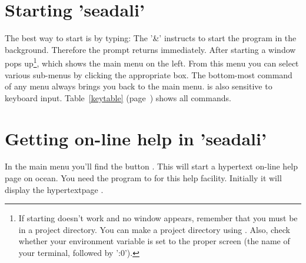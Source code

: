 \section{Starting 'seadali'}
\label{s-start-seadali}
The best way to start  is by typing:
The '\&' instructs  to start the program in the background.
Therefore the prompt returns immediately.
After starting a window pops up\footnote{If starting  doesn't
work and no window appears, remember that you must be in 
a project directory. You can make a project directory using .
Also, check whether your  environment variable is
set to the proper screen (the name of your terminal, followed by ':0').},
which shows the main menu on the left.
From this menu you can select various sub-menus by clicking the
appropriate box.
The bottom-most command of any menu always brings you back
to the main menu.  is also sensitive to keyboard input.
Table~\ref{keytable} (page~\pageref{keytable}) shows all commands.

\section{Getting on-line help in 'seadali'}
In the main menu you'll find the button . This will start a
hypertext on-line help page on ocean. You need the program  to
for this help facility. Initially it will display the hypertextpage 
.

